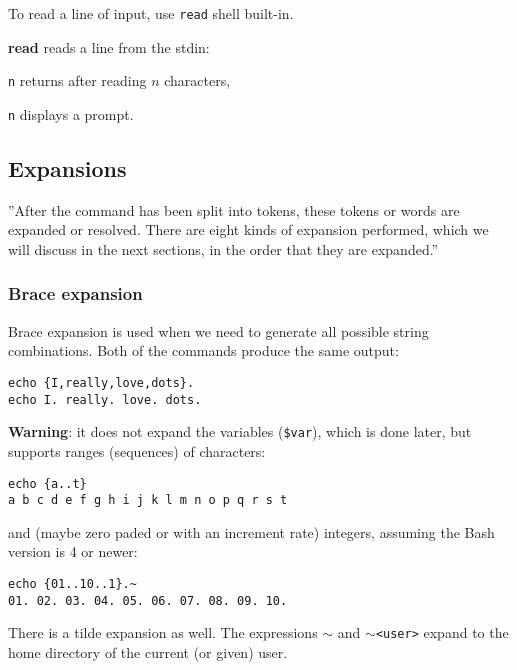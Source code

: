 To read a line of input, use \texttt{read} shell built-in.
\begin{compactenum}
\item [\cmdvar] \textbf{read} reads a line from the stdin: %
\item [\texttt{n}] returns after reading $n$ characters,
\item [\texttt{n}] displays a prompt.
\end{compactenum}

\subsection{Expansions}
''After the command has been split into tokens, these tokens or words are expanded or resolved. There are eight kinds of expansion performed, which we will discuss in the next sections, in the order that they are expanded.''

\subsubsection{Brace expansion}
Brace expansion is used when we need to generate all possible string combinations.
Both of the commands produce the same output:
\begin{verbatim}
echo {I,really,love,dots}.
echo I. really. love. dots.
\end{verbatim}

\textbf{Warning}: it does not expand the variables (\texttt{\$var}), which is done later, but supports ranges (sequences) of characters:
\begin{verbatim}
echo {a..t}
a b c d e f g h i j k l m n o p q r s t
\end{verbatim}

and (maybe zero paded or with an increment rate) integers, assuming the Bash version is 4 or newer:

\begin{verbatim}
echo {01..10..1}.~
01. 02. 03. 04. 05. 06. 07. 08. 09. 10.
\end{verbatim}

There is a tilde expansion as well.
The expressions \texttt{$\sim$} and \texttt{$\sim$<user>} expand to the home directory of the current (or given) user.

\vfill\null
\columnbreak

